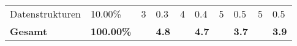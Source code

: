 \begin{sidewaystable}[!htp]
\begin{tabular}{llllllllll}
		Datenstrukturen                           & 10.00\%                                                                             & 3                                                                                     & 0.3                                                                                & 4                                                                                     & 0.4                                                                                & 5                                                                                     & 0.5                                                                                & 5                                                                                     & 0.5                                                                                \\
		\rowcolor[HTML]{BBDAFF}
		\textbf{Gesamt}                           & \textbf{100.00\%}                                                                   & \textbf{}                                                                             & \textbf{4.8}                                                                       & \textbf{}                                                                             & \textbf{4.7}                                                                       & \textbf{}                                                                             & \textbf{3.7}                                                                       & \textbf{}                                                                             & \textbf{3.9}
	\end{tabular}
\end{sidewaystable}

